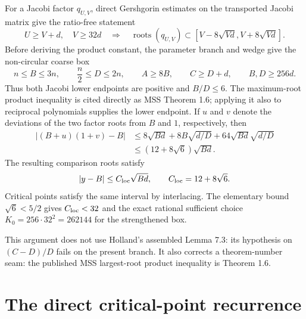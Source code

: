 \documentclass[11pt]{article}
\theoremstyle{definition}
\theoremstyle{remark}
\begin{document}
For a Jacobi factor $q_{U,V}$, direct Gershgorin estimates on the transported
Jacobi matrix give the ratio-free statement
\[
 U\ge V+d,\quad V\ge32d
 \quad\Longrightarrow\quad
 \operatorname{roots}(q_{U,V})\subset
 [V-8\sqrt{Vd},V+8\sqrt{Vd}].
\]
Before deriving the product constant, the parameter branch and wedge give
the non-circular coarse box
\[
 n\le B\le3n,\qquad \frac n2\le D\le2n,
 \qquad A\ge8B,\qquad C\ge D+d,
 \qquad B,D\ge256d.
\]
Thus both Jacobi lower endpoints are positive and $B/D\le6$.  The
maximum-root product inequality is cited directly as MSS Theorem 1.6;
applying it also to reciprocal polynomials supplies the lower endpoint.  If
$u$ and $v$ denote the deviations of the two factor roots from $B$ and $1$,
respectively, then
\begin{align*}
 |(B+u)(1+v)-B|
 &\le8\sqrt{Bd}+8B\sqrt{d/D}
       +64\sqrt{Bd}\sqrt{d/D}\\
 &\le(12+8\sqrt6)\sqrt{Bd}.
\end{align*}
The resulting comparison roots satisfy
\begin{equation}\label{eq:local}
                    |y-B|\le C_{\rm loc}\sqrt{Bd},\qquad
 C_{\rm loc}=12+8\sqrt6.
\end{equation}
Critical points satisfy the same interval by interlacing.  The elementary
bound $\sqrt6<5/2$ gives $C_{\rm loc}<32$ and the exact rational sufficient
choice $K_0=256\cdot32^2=262144$ for the strengthened box.

This argument does not use Holland's assembled Lemma 7.3: its hypothesis on
$(C-D)/D$ fails on the present branch.  It also corrects a theorem-number
seam: the published MSS largest-root product inequality is Theorem 1.6.

\section{The direct critical-point recurrence}\label{sec:recurrence}
\end{document}
